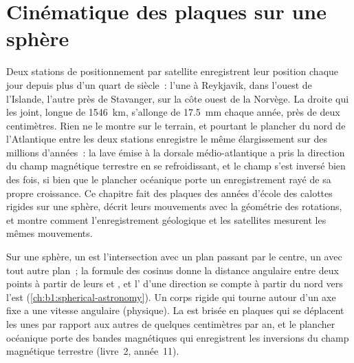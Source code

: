 \chapter{Cinématique des plaques sur une sphère}\label{ch:b1:plate-kinematics}

Deux stations de positionnement par satellite enregistrent leur position chaque
jour depuis plus d'un quart de siècle~: l'une à Reykjavik, dans l'ouest de
l'Islande, l'autre près de Stavanger, sur la côte ouest de la Norvège. La droite
qui les joint, longue de \qty{1546}{km}, s'allonge de \qty{17.5}{mm} chaque année,
près de deux centimètres. Rien ne le montre sur le terrain, et pourtant le plancher du
nord de l'Atlantique entre les deux stations enregistre le même élargissement sur
des millions d'années~: la lave émise à la dorsale médio-atlantique a pris la
direction du champ magnétique terrestre en se refroidissant, et le champ s'est inversé
bien des fois, si bien que le plancher océanique porte un enregistrement rayé de sa
propre croissance. Ce chapitre fait des plaques des années d'école des calottes
rigides sur une sphère, décrit leurs mouvements avec la géométrie des rotations, et
montre comment l'enregistrement géologique et les satellites mesurent les mêmes
mouvements.

\begin{recall}
Sur une sphère, un  est l'intersection avec un plan passant par le
centre, un  avec tout autre plan~; la formule des cosinus donne la
distance angulaire entre deux points à partir de leurs  et , et
l' d'une direction se compte à partir du nord vers l'est
(\cref{ch:b1:spherical-astronomy}). Un corps rigide qui tourne autour d'un axe fixe a
une vitesse angulaire (physique). La  est brisée en plaques qui se
déplacent les unes par rapport aux autres de quelques centimètres par an, et le
plancher océanique porte des bandes magnétiques qui enregistrent les inversions du champ
magnétique terrestre (livre~2, année~11).
\end{recall}


